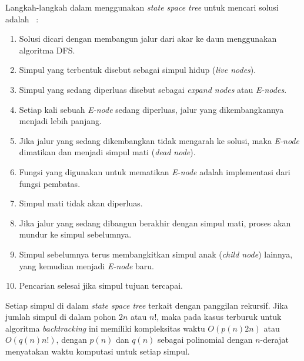 Langkah-langkah dalam menggunakan \textit{state space tree} untuk mencari solusi adalah ~\cite{fahda:16:backtracking}:
\begin{enumerate}
\item Solusi dicari dengan membangun jalur dari akar ke daun menggunakan algoritma DFS.
\item Simpul yang terbentuk disebut sebagai simpul hidup (\textit{live nodes}).
\item Simpul yang sedang diperluas disebut sebagai \textit{expand nodes} atau \textit{E-nodes}.
\item Setiap kali sebuah \textit{E-node} sedang diperluas, jalur yang dikembangkannya menjadi lebih panjang.
\item Jika jalur yang sedang dikembangkan tidak mengarah ke solusi, maka \textit{E-node} dimatikan dan menjadi simpul mati (\textit{dead node}).
\item Fungsi yang digunakan untuk mematikan \textit{E-node} adalah implementasi dari fungsi pembatas.
\item Simpul mati tidak akan diperluas.
\item Jika jalur yang sedang dibangun berakhir dengan simpul mati, proses akan mundur ke simpul sebelumnya.
\item Simpul sebelumnya terus membangkitkan simpul anak (\textit{child node}) lainnya, yang kemudian menjadi \textit{E-node} baru.
\item Pencarian selesai jika simpul tujuan tercapai.
\end{enumerate}
Setiap simpul di dalam \textit{state space tree} terkait dengan panggilan rekursif. Jika jumlah simpul di dalam pohon \begin{math}2n\end{math} atau \begin{math}n!\end{math}, maka pada kasus terburuk untuk algoritma \textit{backtracking} ini memiliki kompleksitas waktu \begin{math}O(p(n)2n)\end{math} atau \begin{math}O(q(n)n!)\end{math}, dengan \begin{math}p(n)\end{math} dan \begin{math}q(n)\end{math} sebagai polinomial dengan \begin{math}n\end{math}-derajat menyatakan waktu komputasi untuk setiap simpul.


